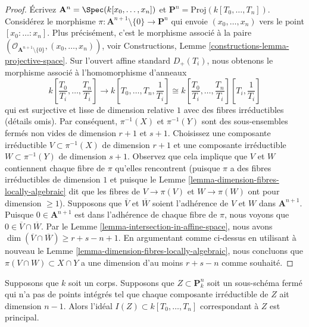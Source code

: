 \begin{proof}
Écrivez $\mathbf{A}^n = \Spec(k[x_0, \ldots, x_n])$ et
$\mathbf{P}^n = \text{Proj}(k[T_0, \ldots, T_n])$.
Considérez le morphisme $\pi : \mathbf{A}^{n + 1}
\setminus \{0\} \to \mathbf{P}^n$ qui envoie $(x_0,
\ldots, x_n)$ vers le point $[x_0 : \ldots : x_n]$. Plus
précisément, c'est le morphisme associé à la paire
$(\mathcal{O}_{\mathbf{A}^{n + 1} \setminus \{0\}}, (x_0,
\ldots, x_n))$, voir Constructions, Lemme
\ref{constructions-lemma-projective-space}. Sur l'ouvert affine standard
$D_+(T_i)$, nous obtenons le morphisme associé à l'homomorphisme d'anneaux
$$
k\left[\frac{T_0}{T_i}, \ldots, \frac{T_n}{T_i}\right]
\longrightarrow
k\left[T_0, \ldots, T_n, \frac{1}{T_i}\right] \cong
k\left[\frac{T_0}{T_i}, \ldots, \frac{T_n}{T_i}\right]
\left[T_i, \frac{1}{T_i}\right]
$$
qui est surjective et lisse de dimension relative $1$ avec des
fibres irréductibles (détails omis). Par conséquent, $\pi^{-1}(X)$
et $\pi^{-1}(Y)$ sont des sous-ensembles fermés non vides de
dimension $r + 1$ et $s + 1$. Choisissez une composante
irréductible $V \subset \pi^{-1}(X)$ de dimension $r + 1$ et une
composante irréductible $W \subset \pi^{-1}(Y)$ de dimension $s + 1$.
Observez que cela implique que $V$ et $W$ contiennent chaque fibre
de $\pi$ qu'elles rencontrent (puisque $\pi$ a des fibres
irréductibles de dimension $1$ et puisque le Lemme
\ref{lemma-dimension-fibres-locally-algebraic} dit que les fibres de $V
\to \pi(V)$ et $W \to \pi(W)$ ont pour dimension $\geq 1$). Supposons
que $\overline{V}$ et $\overline{W}$ soient l'adhérence de $V$ et $W$
dans $\mathbf{A}^{n + 1}$. Puisque $0 \in \mathbf{A}^{n + 1}$ est dans
l'adhérence de chaque fibre de $\pi$, nous voyons que $0 \in
\overline{V} \cap \overline{W}$. Par le Lemme
\ref{lemma-intersection-in-affine-space}, nous avons $\dim(\overline{V} \cap
\overline{W}) \geq r + s - n + 1$. En argumentant comme ci-dessus en utilisant à
nouveau le Lemme \ref{lemma-dimension-fibres-locally-algebraic}, nous concluons que
$\pi(V \cap W) \subset X \cap Y$ a une dimension d'au moins $r + s - n$ comme souhaité.
\end{proof}

\begin{lemma}
\label{lemma-equation-codim-1-in-projective-space}
Supposons que $k$ soit un corps. Supposons que $Z \subset
\mathbf{P}^n_k$ soit un sous-schéma fermé qui n'a pas de points intégrés
tel que chaque composante irréductible de $Z$ ait dimension $n - 1$. Alors
l'idéal $I(Z) \subset k[T_0, \ldots, T_n]$ correspondant à $Z$ est principal.
\end{lemma}

